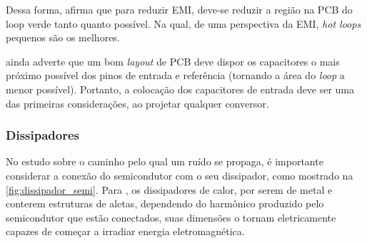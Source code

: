             Dessa forma,  afirma que para reduzir EMI, deve-se reduzir a região na PCB do loop verde tanto quanto possível. Na qual, de uma perspectiva da EMI, \textit{hot loops} pequenos são os melhores.
            
             ainda adverte que um bom \textit{layout} de PCB deve dispor os capacitores o mais próximo possível dos pinos de entrada e referência (tornando a área do \textit{loop} a menor possível). Portanto, a colocação dos capacitores de entrada deve ser uma das primeiras considerações, ao projetar qualquer conversor.
            
            
            

            \subsubsection{Dissipadores} \label{cap:fund_emc_conv_mitig_dissip}
            
            No estudo sobre o caminho pelo qual um ruído se propaga, é importante considerar a conexão do semicondutor com o seu dissipador, como mostrado na \autoref{fig:dissipador_semi}. Para , os dissipadores de calor, por serem de metal e conterem estruturas de aletas, dependendo do harmônico produzido pelo semicondutor que estão conectados, suas dimensões o tornam eletricamente capazes de começar a irradiar energia eletromagnética. 
            
